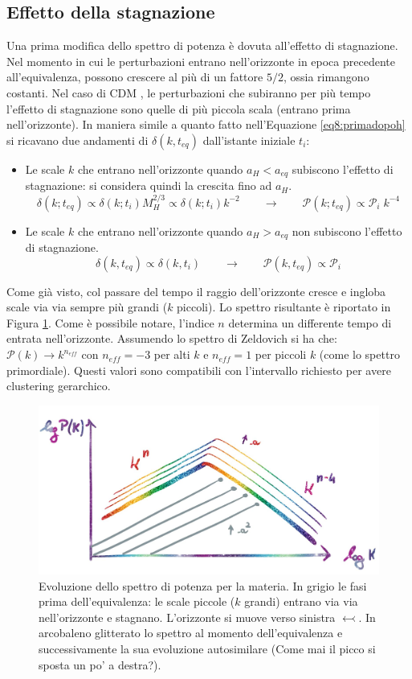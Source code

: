 \subsection{Effetto della stagnazione}
Una prima modifica dello spettro di potenza è dovuta all'effetto di stagnazione. Nel momento in cui le perturbazioni entrano nell'orizzonte in epoca precedente all'equivalenza, possono crescere al più di un fattore $5/2$, ossia rimangono costanti. Nel caso di CDM , le perturbazioni che subiranno per più tempo l'effetto di stagnazione sono quelle di più piccola scala (entrano prima nell'orizzonte). In maniera simile a quanto fatto nell'Equazione \ref{eq8:primadopoh} si ricavano due andamenti di $\delta(k,t_{eq})$ dall'istante iniziale $t_i$:
\begin{itemize}
    \item Le scale $k$ che entrano nell'orizzonte quando $a_H <a_{eq}$ subiscono l'effetto di stagnazione: si considera quindi la crescita fino ad $a_H$. $$ \delta (k; t_{eq})\propto \delta (k; t_i) M_H^{2/3} \propto \delta (k; t_i) k^{-2}\qquad\rightarrow\qquad \mathcal{P}(k; t_{eq}) \propto \mathcal{P}_i\; k^{-4}$$
    \item Le scale $k$ che entrano nell'orizzonte quando $a_H > a_{eq}$ non subiscono l'effetto di stagnazione. $$ \delta (k, t_{eq})\propto \delta (k, t_i) \qquad\rightarrow\qquad \mathcal{P}(k,t_{eq}) \propto \mathcal{P}_i$$
\end{itemize}
Come già visto, col passare del tempo il raggio dell'orizzonte cresce e ingloba scale via via sempre più grandi ($k$ piccoli). Lo spettro risultante è riportato in Figura \ref{fig8:bella}. Come è possibile notare, l'indice $n$ determina un differente tempo di entrata nell'orizzonte. Assumendo lo spettro di Zeldovich si ha che: $\mathcal{P}(k)\rightarrow k^{n_{eff}}$ con $n_{eff}=-3$ per alti $k$ e $n_{eff}=1$ per piccoli $k$ (come lo spettro primordiale). Questi valori sono compatibili con l'intervallo richiesto per avere clustering gerarchico.  
\begin{figure}[H]
    \centering
    \includegraphics[width=\textwidth]{Pictures/8/pertmatevolnic.jpg}
    \caption{Evoluzione dello spettro di potenza per la materia. In grigio le fasi prima dell'equivalenza: le scale piccole ($k$ grandi) entrano via via nell'orizzonte e stagnano. L'orizzonte si muove verso sinistra $\leftarrowtail $. In arcobaleno glitterato lo spettro al momento dell'equivalenza e successivamente la sua evoluzione autosimilare (Come mai il picco si sposta un po' a destra?).} \label{fig8:bella} 
\end{figure}


